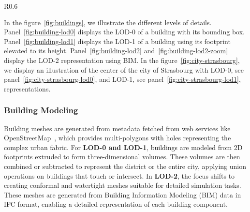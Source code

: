 \documentclass[runningheads]{llncs}
\newcommand{\imagedir}{./} %
\begin{document}
\begin{wrapfigure}{R}{0.6\textwidth} %
\centering
{}
\\ %

{}

\caption{Different representations of a building using our LOD definition}
\label{fig:buildings}
\end{wrapfigure}
In the figure~\ref{fig:buildings}, we illustrate the different levels of details. Panel~\ref{fig:building-lod0} displays the LOD-0 of a building with its bounding box.
Panel~\ref{fig:building-lod1} displays the LOD-1 of a building using its footprint elevated to its height. 
Panel~\ref{fig:building-lod2} and~\ref{fig:building-lod2-zoom} display the LOD-2 representation using BIM. In the figure~\ref{fig:city-strasbourg}, we display an illustration of the center of the city of Strasbourg with LOD-0, see panel~\ref{fig:city-strasbourg-lod0}, and LOD-1, see panel~\ref{fig:city-strasbourg-lod1}, representations.



\subsubsection{Building Modeling}
Building meshes are generated from metadata fetched from web services like OpenStreetMap~\cite{openstreetmap_contributors_planet_2017}, which provides multi-polygons with holes representing the complex urban fabric. For \textbf{LOD-0 and LOD-1}, buildings are modeled from 2D footprints extruded to form three-dimensional volumes. These volumes are then combined or subtracted to represent the district or the entire city, applying union operations on buildings that touch or intersect. In \textbf{LOD-2}, the focus shifts to creating conformal and watertight meshes suitable for detailed simulation tasks. These meshes are generated from Building Information Modeling (BIM) data in IFC format, enabling a detailed representation of each building component.
\end{document}
